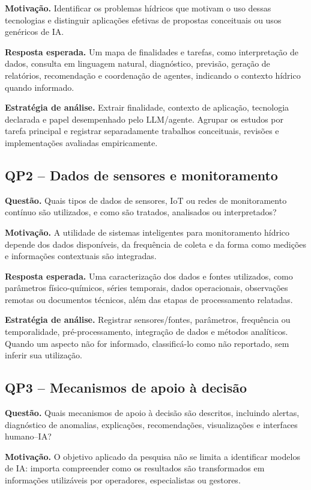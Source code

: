 \textbf{Motivação.} Identificar os problemas hídricos que motivam o uso dessas
tecnologias e distinguir aplicações efetivas de propostas conceituais ou usos
genéricos de IA.

\textbf{Resposta esperada.} Um mapa de finalidades e tarefas, como interpretação
de dados, consulta em linguagem natural, diagnóstico, previsão, geração de
relatórios, recomendação e coordenação de agentes, indicando o contexto hídrico
quando informado.

\textbf{Estratégia de análise.} Extrair finalidade, contexto de aplicação,
tecnologia declarada e papel desempenhado pelo LLM/agente. Agrupar os estudos
por tarefa principal e registrar separadamente trabalhos conceituais, revisões
e implementações avaliadas empiricamente.

\subsection{QP2 -- Dados de sensores e monitoramento}

\textbf{Questão.} Quais tipos de dados de sensores, IoT ou redes de
monitoramento contínuo são utilizados, e como são tratados, analisados ou
interpretados?

\textbf{Motivação.} A utilidade de sistemas inteligentes para monitoramento
hídrico depende dos dados disponíveis, da frequência de coleta e da forma como
medições e informações contextuais são integradas.

\textbf{Resposta esperada.} Uma caracterização dos dados e fontes utilizados,
como parâmetros físico-químicos, séries temporais, dados operacionais,
observações remotas ou documentos técnicos, além das etapas de processamento
relatadas.

\textbf{Estratégia de análise.} Registrar sensores/fontes, parâmetros,
frequência ou temporalidade, pré-processamento, integração de dados e métodos
analíticos. Quando um aspecto não for informado, classificá-lo como não
reportado, sem inferir sua utilização.

\subsection{QP3 -- Mecanismos de apoio à decisão}

\textbf{Questão.} Quais mecanismos de apoio à decisão são descritos, incluindo
alertas, diagnóstico de anomalias, explicações, recomendações, visualizações e
interfaces humano--IA?

\textbf{Motivação.} O objetivo aplicado da pesquisa não se limita a identificar
modelos de IA: importa compreender como os resultados são transformados em
informações utilizáveis por operadores, especialistas ou gestores.

